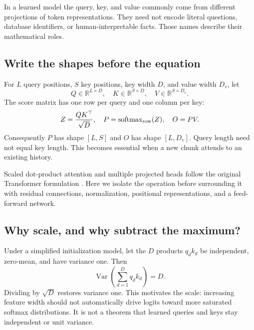 
In a learned model the query, key, and value commonly come from different projections of token representations. They need not encode literal questions, database identifiers, or human-interpretable facts. Those names describe their mathematical roles.

\subsection{Write the shapes before the equation}

For $L$ query positions, $S$ key positions, key width $D$, and value width $D_v$, let
\begin{equation}
Q\in\mathbb R^{L\times D},\quad K\in\mathbb R^{S\times D},
\quad V\in\mathbb R^{S\times D_v}.
\end{equation}
The score matrix has one row per query and one column per key:
\begin{equation}
Z=\frac{QK^\top}{\sqrt D},\quad
P=\operatorname{softmax}_{\rm row}(Z),\quad O=PV.
\label{eq:attention}
\end{equation}
Consequently $P$ has shape $[L,S]$ and $O$ has shape $[L,D_v]$. Query length need not equal key length. This becomes essential when a new chunk attends to an existing history.

Scaled dot-product attention and multiple projected heads follow the original Transformer formulation \cite{vaswani}. Here we isolate the operation before surrounding it with residual connections, normalization, positional representations, and a feed-forward network.

\subsection{Why scale, and why subtract the maximum?}

Under a simplified initialization model, let the $D$ products $q_dk_d$ be independent, zero-mean, and have variance one. Then
\begin{equation}
\operatorname{Var}\left(\sum_{d=1}^{D}q_dk_d\right)=D.
\end{equation}
Dividing by $\sqrt D$ restores variance one. This motivates the scale: increasing feature width should not automatically drive logits toward more saturated softmax distributions. It is not a theorem that learned queries and keys stay independent or unit variance.

